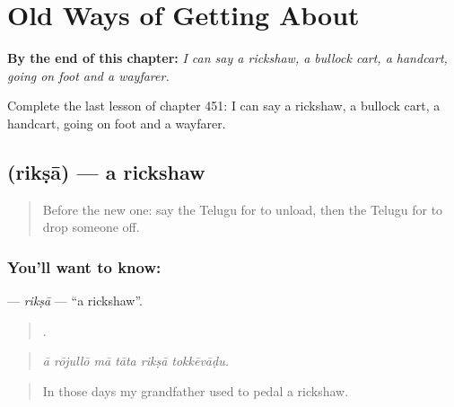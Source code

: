 
\chapter{Old Ways of Getting About}
\label{ch:te-old-ways-of-getting-about}

\begin{chapteropening}
\textbf{By the end of this chapter:} \emph{I can say a rickshaw, a bullock cart, a handcart, going on foot and a wayfarer.}

Complete the last lesson of chapter 451: I can say a rickshaw, a bullock cart, a handcart, going on foot and a wayfarer.
\end{chapteropening}

\section[\texorpdfstring{\te{రిక్షా} (rikṣā)}{రిక్షా (rikṣā)}]{ (rikṣā) — a rickshaw}

\label{lesson:TE-C451-riksa}



\begin{quote}
Before the new one: say the Telugu for to unload, then the Telugu for to drop someone off.
\end{quote}

\subsection*{You'll want to know: }
\textbf{} — \emph{rikṣā} — \textquotedblleft{}a rickshaw\textquotedblright{}.

\begin{quote}
     .
\end{quote}

\begin{quote}
\emph{ā rōjullō mā tāta rikṣā tokkēvāḍu.}
\end{quote}

\begin{quote}
In those days my grandfather used to pedal a rickshaw.
\end{quote}

